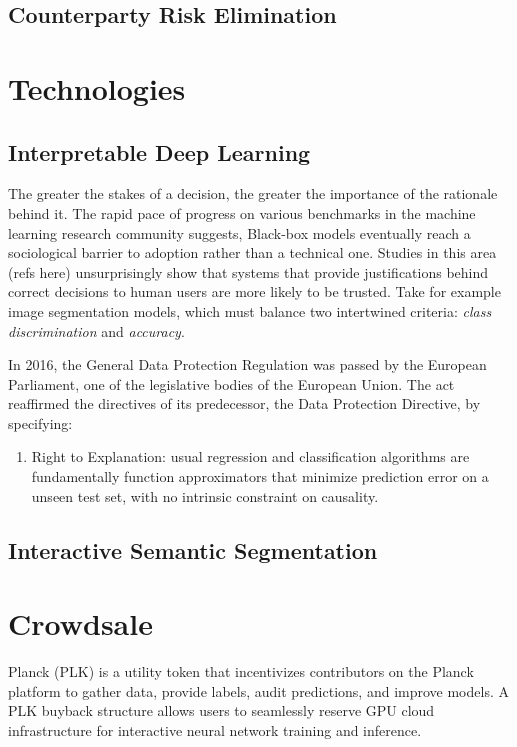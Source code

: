 \documentclass[12pt]{article}
\begin{document}
\subsection{Counterparty Risk Elimination}

\section{Technologies}

\subsection{Interpretable Deep Learning}
The greater the stakes of a decision, the greater the importance of the rationale behind it.  The rapid pace of progress on various benchmarks in the machine learning research community suggests, Black-box models eventually reach a sociological barrier to adoption rather than a technical one.  Studies in this area (refs here) unsurprisingly show that systems that provide justifications behind correct decisions to human users are more likely to be trusted.  Take for example image segmentation models, which must balance two intertwined criteria: \emph{class discrimination} and \emph{accuracy}.

In 2016, the General Data Protection Regulation was passed by the European Parliament, one of the legislative bodies of the European Union.  The act reaffirmed the directives of its predecessor, the Data Protection Directive, by specifying:

\begin{enumerate}
\item{Right to Explanation: usual regression and classification algorithms are fundamentally function approximators that minimize prediction error on a unseen test set, with no intrinsic constraint on causality.  }
\end{enumerate}

\subsection{Interactive Semantic Segmentation}



\section{Crowdsale}
Planck (PLK) is a utility token that incentivizes contributors on the Planck platform to gather data, provide labels, audit predictions, and improve models.  A PLK buyback structure allows users to seamlessly reserve GPU cloud infrastructure for interactive neural network training and inference.
\end{document}
